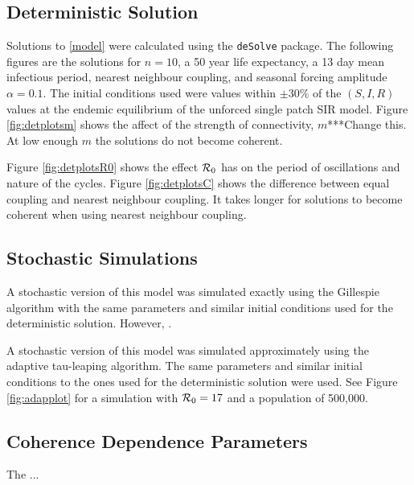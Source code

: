 \documentclass[twocolumn,nofootinbib,showkeys,twoside,floatfix,unsortedaddress,flushbottom,10pt,aps,pra]{report}
\begin{document}
\subsection{Deterministic Solution}
Solutions to \eqref{model} were calculated using the \Rlogo \texttt{deSolve} package. The following figures are the solutions for $n=10$, a 50 year life expectancy, a 13 day mean infectious period, nearest neighbour coupling, and seasonal forcing amplitude $\alpha = 0.1$. The initial conditions used were values within $\pm30\%$ of the $(S,I,R)$ values at the endemic equilibrium of the unforced single patch SIR model. Figure \ref{fig:detplotsm} shows the affect of the strength of connectivity, $m$***Change this. At low enough $m$ the solutions do not become coherent.\par
 \smallskip \qquad
 Figure \ref{fig:detplotsR0} shows the effect ${\cal R}_0$ has on the period of oscillations and nature of the cycles.
Figure \ref{fig:detplotsC} shows the difference between equal coupling and nearest neighbour coupling. It takes longer for solutions to become coherent when using nearest neighbour coupling.



\subsection{Stochastic Simulations} 
\indent
A stochastic version of this model was simulated exactly using the Gillespie algorithm with the same parameters and similar initial conditions used for the deterministic solution. However, . \par
 \smallskip \qquad
A stochastic version of this model was simulated approximately using the adaptive tau-leaping algorithm. The same parameters and similar initial conditions to the ones used for the deterministic solution were used. See Figure \ref{fig:adapplot} for a simulation with ${\cal R}_0=17$ and a population of 500,000.

\begin{figure*}
    \caption{An approximate stochastic simulation using the adaptive tau-leaping method}
    \label{fig:adapplot}
    \centering
    }
    \subfigure[$m=0.01$]
    {
        \texttt{[image: \{images/adaptauECR017m0.2]}.pdf}
    }   
\end{figure*}

\subsection{Coherence Dependence Parameters} 
The ...
\begin{figure*}
    \caption{...}
    \label{fig:3D}
    \centering
    }
    \subfigure[Equal Coupling]
    {
        \texttt{[image: \{images/Adaptau3DEC]}.pdf}
    }   
\end{figure*}
\end{document}
